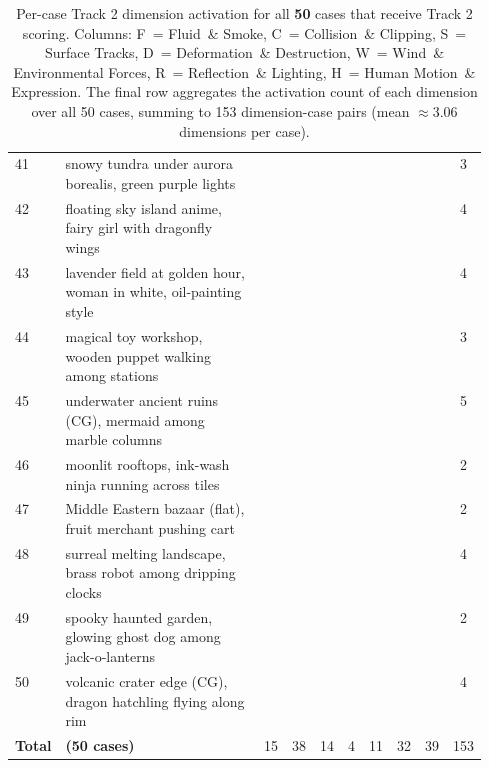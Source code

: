 \documentclass{llmxive}
\providecommand{\cmark}{\ding{51}}
\providecommand{\xmark}{\ding{55}}
\begin{document}
\begin{table}[!htbp]
\begin{tabular}{@{}l p{0.55\linewidth} ccccccc c@{}}
41  & snowy tundra under aurora borealis, green purple lights               & \xmark & \cmark & \cmark & \xmark & \xmark & \cmark & \xmark & 3 \\
42  & floating sky island anime, fairy girl with dragonfly wings            & \cmark & \xmark & \xmark & \xmark & \cmark & \cmark & \cmark & 4 \\
43  & lavender field at golden hour, woman in white, oil-painting style     & \xmark & \xmark & \cmark & \xmark & \cmark & \cmark & \cmark & 4 \\
44  & magical toy workshop, wooden puppet walking among stations            & \xmark & \cmark & \xmark & \xmark & \xmark & \cmark & \cmark & 3 \\
45  & underwater ancient ruins (CG), mermaid among marble columns           & \cmark & \cmark & \cmark & \xmark & \xmark & \cmark & \cmark & 5 \\
46  & moonlit rooftops, ink-wash ninja running across tiles                 & \xmark & \cmark & \xmark & \xmark & \xmark & \xmark & \cmark & 2 \\
47  & Middle Eastern bazaar (flat), fruit merchant pushing cart             & \xmark & \cmark & \xmark & \xmark & \xmark & \xmark & \cmark & 2 \\
48  & surreal melting landscape, brass robot among dripping clocks          & \xmark & \cmark & \cmark & \cmark & \xmark & \xmark & \cmark & 4 \\
49  & spooky haunted garden, glowing ghost dog among jack-o-lanterns        & \xmark & \cmark & \xmark & \xmark & \xmark & \cmark & \xmark & 2 \\
50  & volcanic crater edge (CG), dragon hatchling flying along rim          & \cmark & \xmark & \xmark & \xmark & \cmark & \cmark & \cmark & 4 \\
\midrule
\textbf{Total} & \textbf{(50 cases)} & 15 & 38 & 14 & 4 & 11 & 32 & 39 & 153 \\
\bottomrule
\end{tabular}
\caption[Per-case Track 2 dimension activation]{Per-case Track 2 dimension activation for all \textbf{50} cases that receive Track 2 scoring. Columns: F~= Fluid~\& Smoke, C~= Collision~\& Clipping, S~= Surface Tracks, D~= Deformation~\& Destruction, W~= Wind~\& Environmental Forces, R~= Reflection~\& Lighting, H~= Human Motion~\& Expression. The final row aggregates the activation count of each dimension over all 50 cases, summing to 153 dimension-case pairs (mean $\approx 3.06$ dimensions per case).}
\label{tab:track2_per_case_activation}
\end{table}
\end{document}
